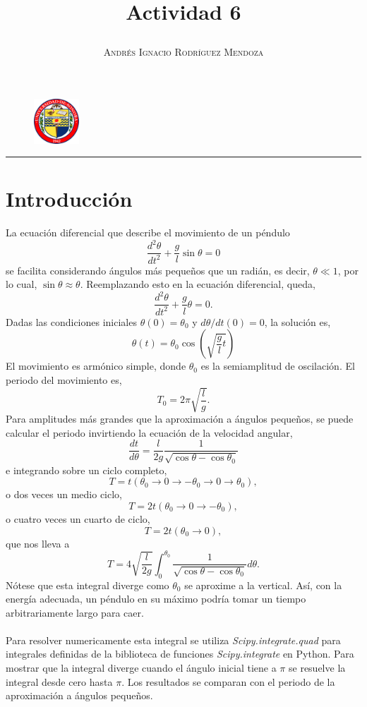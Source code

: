 \documentclass[11pt,spanish]{article}
\title{\vspace{-3cm}\begin{flushleft}\textbf{Actividad 6}\end{flushleft}}
\author{\hspace{-9.6cm}\textsc{Andrés Ignacio Rodríguez Mendoza}}
\date{}
\begin{document}
\begin{figure}
  \begin{center}
   \vspace{-5.4cm} \includegraphics[width=0.15\textwidth]{uni}
  \end{center}
\end{figure}

\maketitle  
\begin{center}
\rule{\textwidth}{1pt}
\end{center}


\section*{Introducción}

La ecuación diferencial que describe el movimiento de un péndulo 
$$\frac{d^2\theta}{dt^2} + \frac{g}{l} \sin \theta = 0$$
se facilita considerando ángulos más pequeños que un radián, es decir, $\theta \ll  1$, por lo cual, $\sin \theta \approx \theta$. Reemplazando esto en la ecuación diferencial, queda,
$$\frac{d^2\theta}{dt^2} + \frac{g}{l} \theta = 0.$$
Dadas las condiciones iniciales $\theta (0) = \theta _ 0$ y $d\theta / dt (0) =0$, la solución es,
$$\theta (t) = \theta _0 \cos \left( \sqrt{\frac{g}{l} t} \right)$$
El movimiento es armónico simple, donde $\theta_0$ es la semiamplitud de oscilación. El periodo del movimiento es,
$$T_0 = 2 \pi \sqrt{\frac{l}{g}}.$$
Para amplitudes más grandes que la aproximación a ángulos pequeños, se puede calcular el periodo invirtiendo la ecuación de la velocidad angular,
$$\frac{dt}{d\theta}=\frac{l}{2g} \frac{1}{\sqrt{\cos \theta - \cos \theta_0}}$$
e integrando sobre un ciclo completo,
$$ T= t(\theta _0 \rightarrow 0 \rightarrow -\theta_0 \rightarrow 0 \rightarrow \theta_0),$$
o dos veces un medio ciclo,
$$ T= 2t(\theta _0 \rightarrow 0 \rightarrow -\theta_0),$$
o cuatro veces un cuarto de ciclo,
$$ T= 2t(\theta _0 \rightarrow 0),$$
que nos lleva a
$$T= 4 \sqrt{\frac{l}{2g}} \int ^{\theta _0} _0 \frac{1}{\sqrt{\cos\theta - \cos\theta_0}} d\theta.$$
Nótese que esta integral diverge como $\theta_0$ se aproxime a la vertical. Así, con la energía adecuada, un péndulo en su máximo podría tomar un tiempo arbitrariamente largo para caer.\\ \\
Para resolver numericamente esta integral se utiliza \textit{Scipy.integrate.quad} para integrales definidas de la biblioteca de funciones \textit{Scipy.integrate} en Python. Para mostrar que la integral diverge cuando el ángulo inicial tiene a $\pi$ se resuelve la integral desde cero hasta $\pi$. Los resultados se comparan con el periodo de la aproximación a ángulos pequeños.
\end{document}
